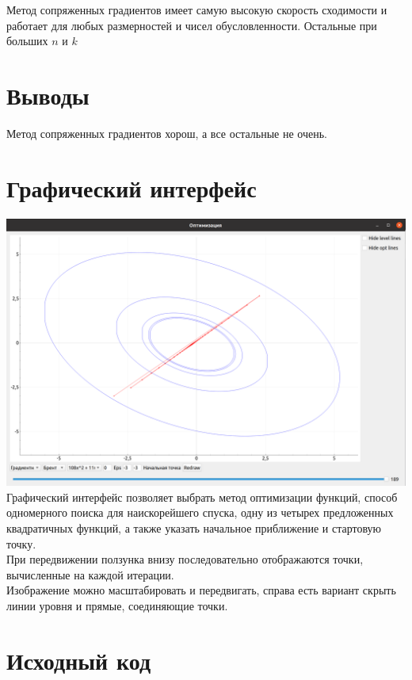 	
	Метод сопряженных градиентов имеет самую высокую скорость сходимости и работает для любых размерностей и чисел обусловленности. 
	Остальные при больших $n$ и $k$
	
	\section{Выводы}
	Метод сопряженных градиентов хорош, а все остальные не очень.
	
	\newpage
	
	\section{Графический интерфейс}
	\includegraphics[scale=0.2]{img/gui.png}\\
	Графический интерфейс позволяет выбрать метод оптимизации функций, способ одномерного поиска для наискорейшего спуска, одну из четырех предложенных квадратичных функций, а также указать начальное приближение и стартовую точку.\\
	При передвижении ползунка внизу последовательно отображаются точки, вычисленные на каждой итерации.\\
	Изображение можно масштабировать и передвигать, справа есть вариант скрыть линии уровня и прямые, соединяющие точки.
	\newpage

	\section{Исходный код}
	
